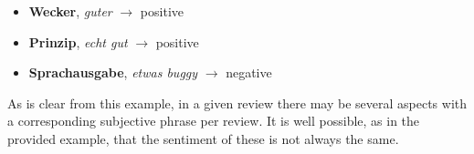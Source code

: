 \begin{itemize}
  \item \textbf{Wecker}, \textit{guter} $\rightarrow$ positive
  \item \textbf{Prinzip}, \textit{echt gut} $\rightarrow$ positive
  \item \textbf{Sprachausgabe}, \textit{etwas buggy} $\rightarrow$ negative
\end{itemize}

As is clear from this example, in a given review there may be several aspects with a corresponding
subjective phrase per review. It is well possible, as in the provided example, that the sentiment
of these is not always the same.






